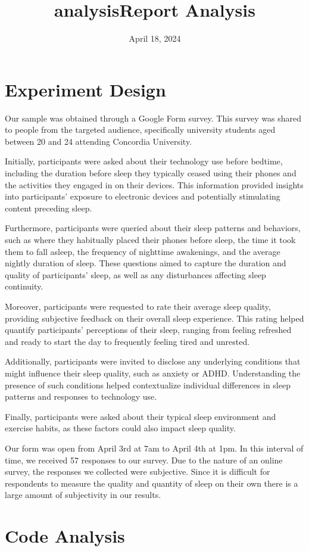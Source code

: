 \documentclass[11pt]{article}
\title{analysis}
\begin{document}
    \title{Report Analysis}
    \date{April 18, 2024}
    \maketitle
    
    

    
    \hypertarget{experiment-design}{%
\section{Experiment Design}\label{experiment-design}}

Our sample was obtained through a Google Form survey. This survey was
shared to people from the targeted audience, specifically university
students aged between 20 and 24 attending Concordia University.

Initially, participants were asked about their technology use before
bedtime, including the duration before sleep they typically ceased using
their phones and the activities they engaged in on their devices. This
information provided insights into participants' exposure to electronic
devices and potentially stimulating content preceding sleep.

Furthermore, participants were queried about their sleep patterns and
behaviors, such as where they habitually placed their phones before
sleep, the time it took them to fall asleep, the frequency of nighttime
awakenings, and the average nightly duration of sleep. These questions
aimed to capture the duration and quality of participants' sleep, as
well as any disturbances affecting sleep continuity.

Moreover, participants were requested to rate their average sleep
quality, providing subjective feedback on their overall sleep
experience. This rating helped quantify participants' perceptions of
their sleep, ranging from feeling refreshed and ready to start the day
to frequently feeling tired and unrested.

Additionally, participants were invited to disclose any underlying
conditions that might influence their sleep quality, such as anxiety or
ADHD. Understanding the presence of such conditions helped contextualize
individual differences in sleep patterns and responses to technology
use.

Finally, participants were asked about their typical sleep environment
and exercise habits, as these factors could also impact sleep quality.

Our form was open from April 3rd at 7am to April 4th at 1pm. In this
interval of time, we received 57 responses to our survey. Due to the
nature of an online survey, the responses we collected were subjective.
Since it is difficult for respondents to measure the quality and
quantity of sleep on their own there is a large amount of subjectivity
in our results.
\newpage
    \hypertarget{code-analysis}{%
\section{Code Analysis}\label{code-analysis}}
\end{document}
